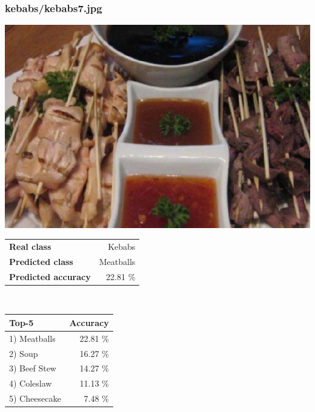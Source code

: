 \subsubsection{kebabs/kebabs7.jpg}

\begin{minipage}[t]{0.4\textwidth}
	\vspace{0pt}
	\includegraphics[width=\linewidth]{images/evaluation-images/kebabs/kebabs7.jpg}
\end{minipage}
\hfill
\begin{minipage}[t]{0.5\textwidth}
	\vspace{0pt}\raggedright
	\begin{tabularx}{\textwidth}{X r}
		\small \textbf{Real class} & \small Kebabs\\
		\small \textbf{Predicted class} & \small Meatballs\\
		\small \textbf{Predicted accuracy} & \small 22.81 \%
    \end{tabularx}\\
    
    \vspace{6pt}
	\begin{tabularx}{\textwidth}{X r}
        \small \textbf{Top-5} & \small \textbf{Accuracy} \\
        \hline
		\small 1) Meatballs & \small 22.81 \%\\\small 2) Soup & \small 16.27 \%\\\small 3) Beef Stew & \small 14.27 \%\\\small 4) Coleslaw & \small 11.13 \%\\\small 5) Cheesecake & \small 7.48 \%
    \end{tabularx}
\end{minipage}
    
